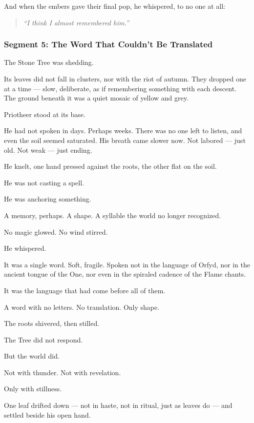 \documentclass[9pt]{article}
\begin{document}
And when the embers gave their final pop, he whispered, to no one at all:

\begin{quote}
\emph{``I think I almost remembered him.''}
\end{quote}


\newpage

\subsubsection*{Segment 5: The Word That Couldn’t Be Translated}

The Stone Tree was shedding.

Its leaves did not fall in clusters, nor with the riot of autumn. They dropped one at a time — slow, deliberate, as if remembering something with each descent. The ground beneath it was a quiet mosaic of yellow and grey.

Priotheer stood at its base.

He had not spoken in days. Perhaps weeks. There was no one left to listen, and even the soil seemed saturated. His breath came slower now. Not labored — just old. Not weak — just ending.

He knelt, one hand pressed against the roots, the other flat on the soil.

He was not casting a spell.

He was anchoring something.

A memory, perhaps. A shape. A syllable the world no longer recognized.

No magic glowed. No wind stirred.

He whispered.

It was a single word. Soft, fragile. Spoken not in the language of Orfyd, nor in the ancient tongue of the One, nor even in the spiraled cadence of the Flame chants.

It was the language that had come before all of them.

A word with no letters. No translation. Only shape.

The roots shivered, then stilled.

The Tree did not respond.

But the world did.

Not with thunder. Not with revelation.

Only with stillness.

One leaf drifted down — not in haste, not in ritual, just as leaves do — and settled beside his open hand.
\end{document}
